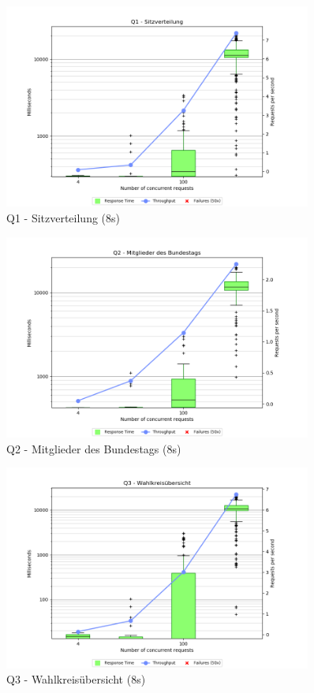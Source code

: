 \documentclass[a4paper]{scrreprt}
\begin{document}
\begin{figure}[htb!]
	\centering
	\includegraphics[width=0.9\textwidth]{images/plots_8s/Q1}
	\caption {Q1 - Sitzverteilung (8s)}
\end{figure}

\begin{figure}[htb!]
	\centering
	\includegraphics[width=0.9\textwidth]{images/plots_8s/Q2}
	\caption {Q2 - Mitglieder des Bundestags (8s)}
\end{figure}

\begin{figure}[htb!]
	\centering
	\includegraphics[width=0.9\textwidth]{images/plots_8s/Q3}
	\caption {Q3 - Wahlkreisübersicht (8s)}
\end{figure}
\end{document}
